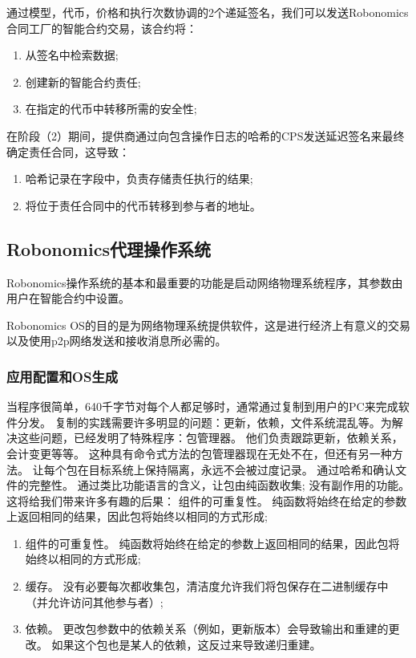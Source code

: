 \documentclass[UTF8]{article}
\begin{document}
通过模型，代币，价格和执行次数协调的2个递延签名，我们可以发送Robonomics合同工厂的智能合约交易，该合约将：

\begin{enumerate}
	\item 从签名中检索数据;
	\item 创建新的智能合约责任;
	\item 在指定的代币中转移所需的安全性;
\end{enumerate}

在阶段（2）期间，提供商通过向包含操作日志的哈希的CPS发送延迟签名来最终确定责任合同，这导致：
\begin{enumerate}
	\item 哈希记录在字段中，负责存储责任执行的结果;
	\item 将位于责任合同中的代币转移到参与者的地址。
\end{enumerate}

\subsection{Robonomics代理操作系统}

Robonomics操作系统的基本和最重要的功能是启动网络物理系统程序，其参数由用户在智能合约中设置。

Robonomics OS的目的是为网络物理系统提供软件，这是进行经济上有意义的交易以及使用p2p网络发送和接收消息所必需的。

\subsubsection{应用配置和OS生成}
当程序很简单，640千字节对每个人都足够时，通常通过复制到用户的PC来完成软件分发。 复制的实践需要许多明显的问题：更新，依赖，文件系统混乱等。为解决这些问题，已经发明了特殊程序：包管理器。 他们负责跟踪更新，依赖关系，会计变更等等。 这种具有命令式方法的包管理器现在无处不在，但还有另一种方法。
让每个包在目标系统上保持隔离，永远不会被过度记录。 通过哈希和确认文件的完整性。 通过类比功能语言的含义，让包由纯函数收集; 没有副作用的功能。 这将给我们带来许多有趣的后果：
组件的可重复性。 纯函数将始终在给定的参数上返回相同的结果，因此包将始终以相同的方式形成;

\begin{enumerate}
\item 组件的可重复性。 纯函数将始终在给定的参数上返回相同的结果，因此包将始终以相同的方式形成;
\item 缓存。 没有必要每次都收集包，清洁度允许我们将包保存在二进制缓存中（并允许访问其他参与者）;
\item 依赖。 更改包参数中的依赖关系（例如，更新版本）会导致输出和重建的更改。 如果这个包也是某人的依赖，这反过来导致递归重建。
\end{enumerate}
\end{document}
